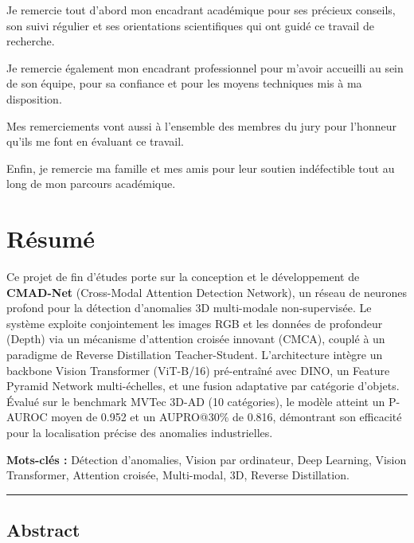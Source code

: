 \documentclass[12pt,a4paper,oneside]{report}
\begin{document}
Je remercie tout d'abord mon encadrant académique pour ses précieux conseils, son suivi régulier et ses orientations scientifiques qui ont guidé ce travail de recherche.

Je remercie également mon encadrant professionnel pour m'avoir accueilli au sein de son équipe, pour sa confiance et pour les moyens techniques mis à ma disposition.

Mes remerciements vont aussi à l'ensemble des membres du jury pour l'honneur qu'ils me font en évaluant ce travail.

Enfin, je remercie ma famille et mes amis pour leur soutien indéfectible tout au long de mon parcours académique.

\chapter*{Résumé}

Ce projet de fin d'études porte sur la conception et le développement de \textbf{CMAD-Net} (Cross-Modal Attention Detection Network), un réseau de neurones profond pour la détection d'anomalies 3D multi-modale non-supervisée. Le système exploite conjointement les images RGB et les données de profondeur (Depth) via un mécanisme d'attention croisée innovant (CMCA), couplé à un paradigme de Reverse Distillation Teacher-Student. L'architecture intègre un backbone Vision Transformer (ViT-B/16) pré-entraîné avec DINO, un Feature Pyramid Network multi-échelles, et une fusion adaptative par catégorie d'objets. Évalué sur le benchmark MVTec 3D-AD (10 catégories), le modèle atteint un P-AUROC moyen de 0.952 et un AUPRO@30\% de 0.816, démontrant son efficacité pour la localisation précise des anomalies industrielles.

\medskip
\noindent\textbf{Mots-clés :} Détection d'anomalies, Vision par ordinateur, Deep Learning, Vision Transformer, Attention croisée, Multi-modal, 3D, Reverse Distillation.

\vspace{2cm}

\begin{center}
\rule{0.6\textwidth}{0.4pt}
\end{center}

\vspace{0.8cm}

\section*{Abstract}
\end{document}

